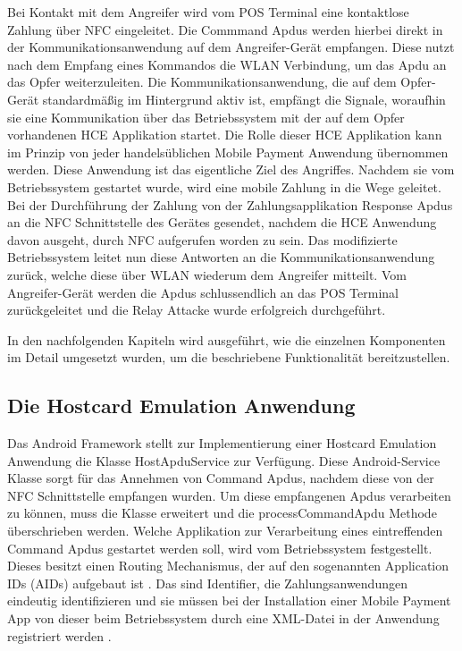  Bei Kontakt mit dem Angreifer wird vom POS Terminal eine kontaktlose Zahlung über NFC eingeleitet. Die Commmand Apdus werden hierbei direkt in der Kommunikationsanwendung auf dem Angreifer-Gerät empfangen. Diese nutzt nach dem Empfang eines Kommandos die WLAN Verbindung, um das Apdu an das Opfer weiterzuleiten. Die Kommunikationsanwendung, die auf dem Opfer-Gerät standardmäßig im Hintergrund aktiv ist, empfängt die Signale, woraufhin sie eine Kommunikation über das Betriebssystem mit der auf dem Opfer vorhandenen HCE Applikation startet. Die Rolle dieser HCE Applikation kann im Prinzip von jeder handelsüblichen Mobile Payment Anwendung übernommen werden. Diese Anwendung ist das eigentliche Ziel des Angriffes. Nachdem sie vom Betriebssystem gestartet wurde, wird eine mobile Zahlung in die Wege geleitet. 
Bei der Durchführung der Zahlung von der Zahlungsapplikation Response Apdus an die NFC Schnittstelle des Gerätes gesendet, nachdem die HCE Anwendung davon ausgeht, durch NFC aufgerufen worden zu sein. 
Das modifizierte Betriebssystem leitet nun diese Antworten an die Kommunikationsanwendung zurück, welche diese über WLAN wiederum dem Angreifer mitteilt. Vom Angreifer-Gerät werden die Apdus schlussendlich an das POS Terminal zurückgeleitet und die Relay Attacke wurde erfolgreich durchgeführt. 

In den nachfolgenden Kapiteln wird ausgeführt, wie die einzelnen Komponenten im Detail umgesetzt wurden, um die beschriebene Funktionalität bereitzustellen. 

\subsection{Die Hostcard Emulation Anwendung}

Das Android Framework stellt zur Implementierung einer Hostcard Emulation Anwendung die Klasse HostApduService zur Verfügung. Diese Android-Service Klasse sorgt für das Annehmen von Command Apdus, nachdem diese von der NFC Schnittstelle empfangen wurden. Um diese empfangenen Apdus verarbeiten zu können, muss die Klasse erweitert und die processCommandApdu Methode überschrieben werden. 
Welche Applikation zur Verarbeitung eines eintreffenden Command Apdus gestartet werden soll, wird vom Betriebssystem festgestellt. Dieses besitzt einen Routing Mechanismus, der auf den sogenannten Application IDs (AIDs) aufgebaut ist \cite{androidHce}. Das sind Identifier, die Zahlungsanwendungen eindeutig identifizieren und sie müssen bei der Installation einer Mobile Payment App von dieser beim Betriebssystem durch eine XML-Datei in der Anwendung registriert werden \cite{androidHce}.

